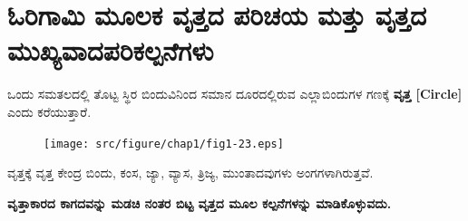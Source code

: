  
\section{ಓರಿಗಾಮಿ ಮೂಲಕ ವೃತ್ತದ ಪರಿಚಯ ಮತ್ತು ವೃತ್ತದ ಮುಖ್ಯವಾದ\break ಪರಿಕಲ್ಪನೆಗಳು}\label{sec1.12}%
 

ಒಂದು ಸಮತಲದಲ್ಲಿ ತೊಟ್ಟ ಸ್ಥಿರ ಬಿಂದುವಿನಿಂದ ಸಮಾನ ದೂರದಲ್ಲಿರುವ ಎಲ್ಲಾ\break  ಬಿಂದುಗಳ ಗಣಕ್ಕೆ \textbf{ವೃತ್ತ [Circle]} ಎಂದು ಕರೆಯುತ್ತಾರೆ. 
\begin{figure}[H]
\centering
\texttt{[image: src/figure/chap1/fig1-23.eps]}
\end{figure}
 
ವೃತ್ತಕ್ಕೆ ವೃತ್ತ ಕೇಂದ್ರ ಬಿಂದು, ಕಂಸ, ಜ್ಯಾ, ವ್ಯಾಸ, ತ್ರಿಜ್ಯ, ಮುಂತಾದವುಗಳು ಅಂಗಗಳಾಗಿರುತ್ತವೆ. 
 

\noindent
\textbf{ವೃತ್ತಾಕಾರದ ಕಾಗದವನ್ನು ಮಡಚಿ ನಂತರ ಬಿಟ್ಟ ವೃತ್ತದ ಮೂಲ ಕಲ್ಪನೆಗಳನ್ನು ಮಾಡಿಕೊಳ್ಳು\-ವದು.}

